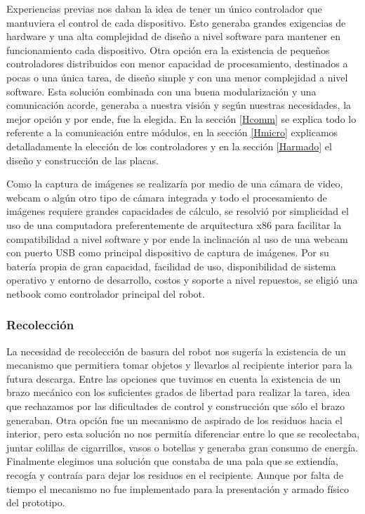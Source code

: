 Experiencias previas nos daban la idea de tener un \'unico controlador que mantuviera el control de cada dispositivo. Esto generaba grandes exigencias de hardware y
una alta complejidad de dise\~no a nivel software para mantener en funcionamiento cada dispositivo. Otra opci\'on era la existencia de peque\~nos
controladores distribuidos con menor capacidad de procesamiento, destinados a pocas o una \'unica tarea, de dise\~no simple y con una menor complejidad
a nivel software. Esta soluci\'on combinada con una buena modularizaci\'on y una comunicaci\'on acorde, generaba a nuestra visi\'on y seg\'un
nuestras necesidades, la mejor opci\'on y por ende, fue la elegida.
En la secci\'on \ref{Hcomm} se explica todo lo referente a la comunicaci\'on entre m\'odulos, en la secci\'on \ref{Hmicro} explicamos detalladamente
la elecci\'on de los controladores y en la secci\'on \ref{Harmado} el dise\~no y construcci\'on de las placas.

Como la captura de im\'agenes se realizar\'ia por medio de una c\'amara de video, webcam o alg\'un otro tipo de c\'amara integrada y todo el
procesamiento de im\'agenes requiere grandes capacidades de c\'alculo, se resolvi\'o por simplicidad el uso de una computadora preferentemente de
arquitectura x86 para facilitar la compatibilidad a nivel software y por ende la inclinaci\'on al uso de una webcam con puerto USB como principal
dispositivo de captura de im\'agenes.
Por su bater\'ia propia de gran capacidad, facilidad de uso, disponibilidad de sistema operativo y entorno de desarrollo, costos y soporte a nivel
repuestos, se eligi\'o una netbook como controlador principal del robot.

\subsubsection{Recolecci\'on}

La necesidad de recolecci\'on de basura del robot nos suger\'ia la existencia de un mecanismo que permitiera tomar objetos y llevarlos al recipiente
interior para la futura descarga. Entre las opciones que tuvimos en cuenta la existencia de un brazo mec\'anico con los suficientes grados de
libertad para realizar la tarea, idea que rechazamos por las dificultades de control y construcci\'on que s\'olo el brazo generaban. Otra opci\'on fue
un mecanismo de aspirado de los residuos hacia el interior, pero esta soluci\'on no nos permit\'ia diferenciar entre lo que se recolectaba, juntar
colillas de cigarrillos, vasos o botellas y generaba gran consumo de energ\'ia. Finalmente elegimos una soluci\'on que constaba de una pala que se
extiend\'ia, recog\'ia y contra\'ia para dejar los residuos en el recipiente. Aunque por falta de tiempo el mecanismo no fue implementado para la
presentaci\'on y armado f\'isico del prototipo.

